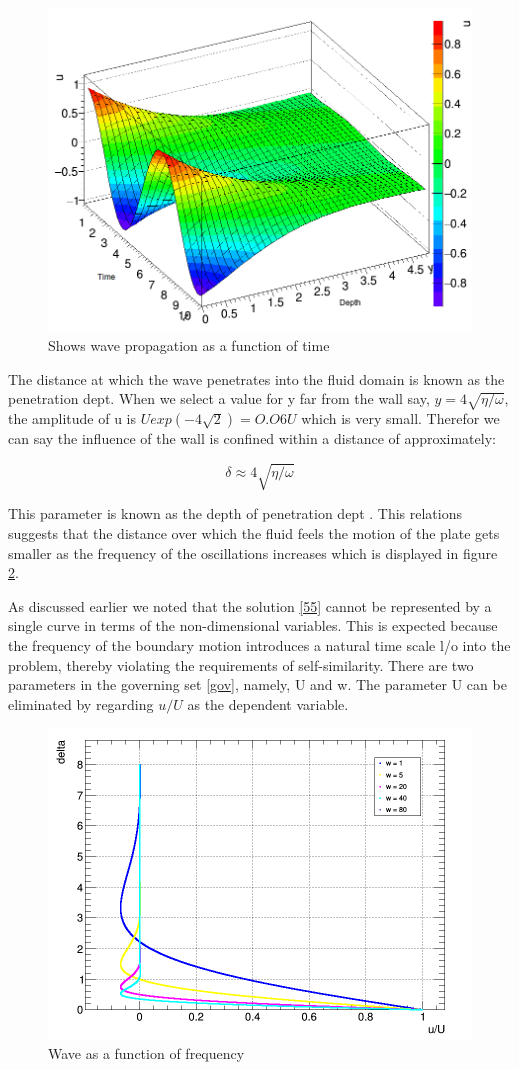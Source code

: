 \documentclass[paper=a4, fontsize=12pt, abstract=on]{scrartcl}
\numberwithin{equation}{section}		%
\numberwithin{figure}{section}			%
\numberwithin{table}{section}				%
\begin{document}
\begin{figure}[H]
\centering
\includegraphics[width=0.70\linewidth]{q2}
\caption{Shows wave propagation as a function of time}
\label{q2}
\end{figure}

The distance at which the wave penetrates into the fluid domain is known as the penetration dept. When we select a value for y far from the wall say, $y = 4\sqrt{\eta/\omega}$, the amplitude of u is $U exp(-4\sqrt{2}) = O.O6U$ which is very small. Therefor we can say the influence of the wall is confined within a distance of approximately:

\begin{equation}
\label{56}
\delta \approx 4\sqrt{\eta/\omega}
\end{equation}

This parameter is known as the depth of penetration dept \cite{g}. This relations suggests that the distance over which the fluid feels the motion of the plate gets smaller as the frequency of the oscillations increases which is displayed in figure \ref{q4}. 


As discussed earlier we noted that the solution \ref{55} cannot be represented by a single curve in terms of the non-dimensional variables. This is expected because the frequency of the boundary motion introduces a natural time scale l/o into the problem, thereby violating the requirements of self-similarity. There are two parameters in the governing set \ref{gov}, namely, U and w. The parameter U can be eliminated by regarding $u / U$ as the dependent variable. 



\begin{figure}[H]
\centering
\includegraphics[width=0.70\linewidth]{q4}
\caption{Wave as a function of frequency}
\label{q4}
\end{figure}
\end{document}
